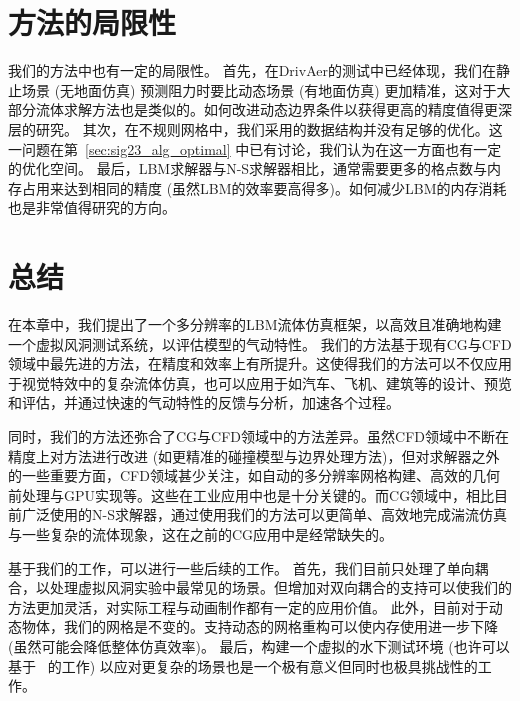\section{方法的局限性}
我们的方法中也有一定的局限性。
首先，在DrivAer的测试中已经体现，我们在静止场景 (无地面仿真) 预测阻力时要比动态场景 (有地面仿真) 更加精准，这对于大部分流体求解方法也是类似的。如何改进动态边界条件以获得更高的精度值得更深层的研究。
其次，在不规则网格中，我们采用的数据结构并没有足够的优化。这一问题在第~\ref{sec:sig23_alg_optimal} 中已有讨论，我们认为在这一方面也有一定的优化空间。
最后，LBM求解器与N-S求解器相比，通常需要更多的格点数与内存占用来达到相同的精度 (虽然LBM的效率要高得多)。如何减少LBM的内存消耗也是非常值得研究的方向。

\section{总结}
在本章中，我们提出了一个多分辨率的LBM流体仿真框架，以高效且准确地构建一个虚拟风洞测试系统，以评估模型的气动特性。
我们的方法基于现有CG与CFD领域中最先进的方法，在精度和效率上有所提升。这使得我们的方法可以不仅应用于视觉特效中的复杂流体仿真，也可以应用于如汽车、飞机、建筑等的设计、预览和评估，并通过快速的气动特性的反馈与分析，加速各个过程。

同时，我们的方法还弥合了CG与CFD领域中的方法差异。虽然CFD领域中不断在精度上对方法进行改进 (如更精准的碰撞模型与边界处理方法)，但对求解器之外的一些重要方面，CFD领域甚少关注，如自动的多分辨率网格构建、高效的几何前处理与GPU实现等。这些在工业应用中也是十分关键的。而CG领域中，相比目前广泛使用的N-S求解器，通过使用我们的方法可以更简单、高效地完成湍流仿真与一些复杂的流体现象，这在之前的CG应用中是经常缺失的。

基于我们的工作，可以进行一些后续的工作。
首先，我们目前只处理了单向耦合，以处理虚拟风洞实验中最常见的场景。但增加对双向耦合的支持可以使我们的方法更加灵活，对实际工程与动画制作都有一定的应用价值。
此外，目前对于动态物体，我们的网格是不变的。支持动态的网格重构可以使内存使用进一步下降 (虽然可能会降低整体仿真效率)。
最后，构建一个虚拟的水下测试环境 (也许可以基于~\cite{Wei:2022, Wei:2023} 的工作) 以应对更复杂的场景也是一个极有意义但同时也极具挑战性的工作。